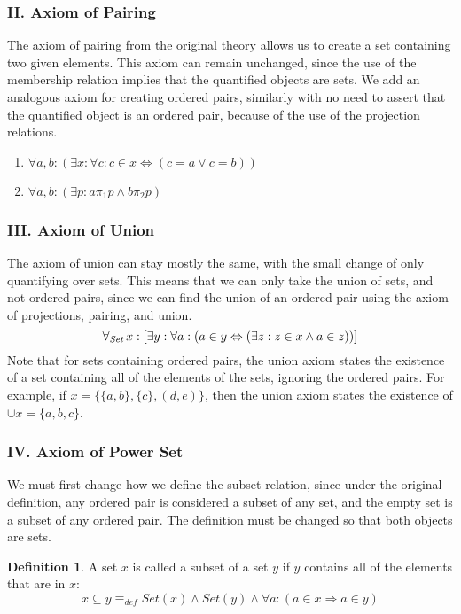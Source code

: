 \documentclass[11pt]{report}
\newcommand{\all}[1]{\forall_{\mathit{#1}}\hspace{0.5mm}}
\newcommand{\eqdef}{\equiv_\mathit{def}}
\newcommand{\pleft}{\mathrel{\pi_1}}
\newcommand{\pright}{\mathrel{\pi_2}}
\theoremstyle{definition}
\theoremstyle{theorem}
\theoremstyle{lemma}
\newtheorem{definition}{Definition}[section]
\begin{document}
\subsubsection*{II. Axiom of Pairing}
The axiom of pairing from the original theory allows us to create a set containing two given elements.
This axiom can remain unchanged, since the use of the membership relation implies that the quantified objects are sets.
We add an analogous axiom for creating ordered pairs, similarly with no need to assert that the quantified object is an ordered pair, because of the use of the projection relations.
\begin{enumerate}[label=(\roman*)]
\item $\forall a,b: (\exists x: \forall c:
          c\in x \Leftrightarrow (c=a \vee c=b))$
\item $\forall a,b: (\exists p: a\pleft p \wedge b\pright p)$
\end{enumerate}

\subsubsection*{III. Axiom of Union}
The axiom of union can stay mostly the same, with the small change of only quantifying over sets.
This means that we can only take the union of sets, and not ordered pairs, since we can find the union of an ordered pair using the axiom of projections, pairing, and union.
$$\all{Set}x: [\exists y:\forall a:
    (a\in y \Leftrightarrow (\exists z: z\in x \wedge a\in z))]$$
Note that for sets containing ordered pairs, the union axiom states the existence of a set containing all of the elements of the sets, ignoring the ordered pairs.
For example, if $x=\{\{a,b\},\{c\},(d,e)\}$, then the union axiom states the existence of $\cup x=\{a,b,c\}$.
\subsubsection*{IV. Axiom of Power Set}
We must first change how we define the subset relation, since under the original definition, any ordered pair is considered a subset of any set, and the empty set is a subset of any ordered pair.
The definition must be changed so that both objects are sets.

\begin{definition} A set $x$ is called a subset of a set $y$ if $y$ contains all of the elements that are in $x$:
$$x\subseteq y \eqdef \mathit{Set}(x) \wedge
               \mathit{Set}(y) \wedge
                \forall a: (a\in x \Rightarrow a\in y)$$
\end{definition}
\end{document}
